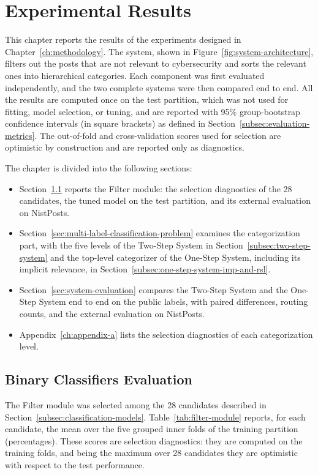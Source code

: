 \chapter{Experimental Results}\label{ch:experimental-results}
This chapter reports the results of the experiments designed in Chapter~\ref{ch:methodology}. The system, shown in Figure~\ref{fig:system-architecture}, filters out the posts that are not relevant to cybersecurity and sorts the relevant ones into hierarchical categories. Each component was first evaluated independently, and the two complete systems were then compared end to end. All the results are computed once on the test partition, which was not used for fitting, model selection, or tuning, and are reported with 95{\%} group-bootstrap confidence intervals (in square brackets) as defined in Section~\ref{subsec:evaluation-metrics}. The out-of-fold and cross-validation scores used for selection are optimistic by construction and are reported only as diagnostics.

The chapter is divided into the following sections:
\begin{itemize}
    \item Section~\ref{sec:binary-classifiers-evaluation} reports the Filter module: the selection diagnostics of the 28 candidates, the tuned model on the test partition, and its external evaluation on NistPosts.
    \item Section~\ref{sec:multi-label-classification-problem} examines the categorization part, with the five levels of the Two-Step System in Section~\ref{subsec:two-step-system} and the top-level categorizer of the One-Step System, including its implicit relevance, in Section~\ref{subsec:one-step-system-imp-and-rsl}.
    \item Section~\ref{sec:system-evaluation} compares the Two-Step System and the One-Step System end to end on the public labels, with paired differences, routing counts, and the external evaluation on NistPosts.
    \item Appendix~\ref{ch:appendix-a} lists the selection diagnostics of each categorization level.
\end{itemize}


\section{Binary Classifiers Evaluation}\label{sec:binary-classifiers-evaluation}
The Filter module was selected among the 28 candidates described in Section~\ref{subsec:classification-models}. Table~\ref{tab:filter-module} reports, for each candidate, the mean over the five grouped inner folds of the training partition (percentages). These scores are selection diagnostics: they are computed on the training folds, and being the maximum over 28 candidates they are optimistic with respect to the test performance.

